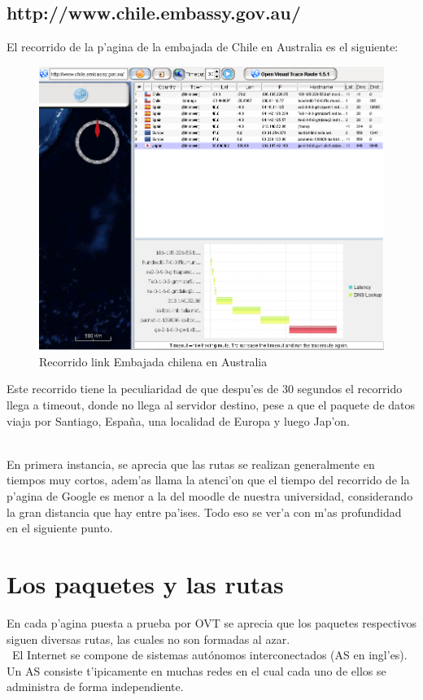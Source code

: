 \documentclass{article}
\begin{document}
\subsection{http://www.chile.embassy.gov.au/}
El recorrido de la p'agina de la embajada de Chile en Australia es el siguiente:
\\
\begin{figure}[H]
  \centering
    \includegraphics[width=1.0\textwidth]{ruta1_embchile}
  \caption{Recorrido link Embajada chilena en Australia}
  \label{embchile}
\end{figure}

Este recorrido tiene la peculiaridad de que despu'es de 30 segundos el recorrido llega a timeout, donde no llega al servidor destino, pese a que el paquete de datos viaja por Santiago, Espa\~na, una localidad de Europa y luego Jap'on.\\ \

En primera instancia, se aprecia que las rutas se realizan generalmente en tiempos muy cortos, adem'as llama la atenci'on que el tiempo del recorrido de la p'agina de Google es menor a la del moodle de nuestra universidad, considerando la gran distancia que hay entre pa'ises. Todo eso se ver'a con m'as profundidad en el siguiente punto.

\section{Los paquetes y las rutas}
En cada p'agina puesta a prueba por OVT se aprecia que los paquetes respectivos siguen diversas rutas, las cuales no son formadas al azar.\\ \
El Internet se compone de sistemas autónomos interconectados (AS en ingl'es). Un AS consiste t'ipicamente en muchas redes en el cual cada uno de ellos se administra de forma independiente.\\ \
\end{document}
